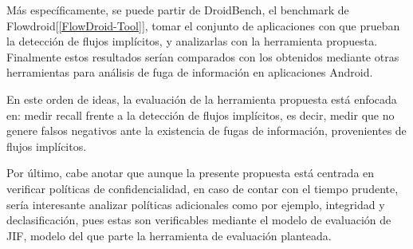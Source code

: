 
Más específicamente, se puede partir de DroidBench\cite{DroidBenchBenchmarks},
el benchmark de Flowdroid[\ref{FlowDroid-Tool}], tomar el conjunto de
aplicaciones con que prueban la detección de flujos implícitos, y analizarlas
con la herramienta propuesta.\newline
Finalmente estos resultados serían
comparados con los obtenidos mediante otras herramientas para análisis de fuga
de información en aplicaciones Android.\newline

En este orden de ideas, la evaluación de la herramienta propuesta está enfocada
en: medir recall frente a la detección de flujos implícitos, es decir, medir que
no genere falsos negativos ante la existencia de fugas de información,
provenientes de flujos implícitos.\newline

Por último, cabe anotar que aunque la presente propuesta está centrada en
verificar políticas de confidencialidad, en caso de contar con el tiempo
prudente, sería interesante analizar políticas adicionales como por ejemplo,
integridad y declasificación, pues estas son verificables mediante el modelo de
evaluación de JIF, modelo del que parte la herramienta de evaluación planteada.







